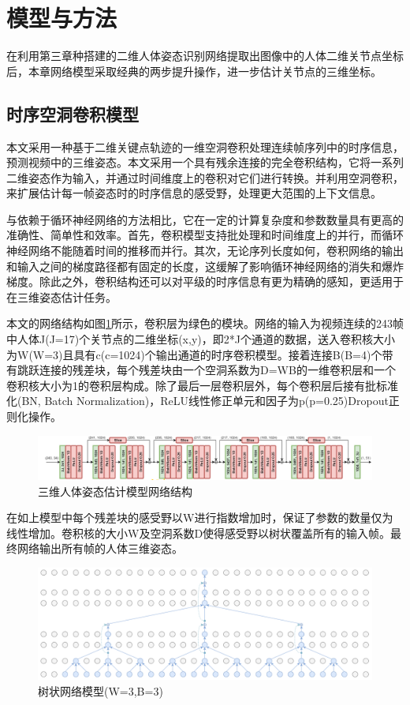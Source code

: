 \section{模型与方法}
在利用第三章种搭建的二维人体姿态识别网络提取出图像中的人体二维关节点坐标后，本章网络模型采取经典的两步提升操作，进一步估计关节点的三维坐标。

\subsection{时序空洞卷积模型}{}
本文采用一种基于二维关键点轨迹的一维空洞卷积处理连续帧序列中的时序信息，预测视频中的三维姿态。本文采用一个具有残余连接的完全卷积结构，它将一系列二维姿态作为输入，并通过时间维度上的卷积对它们进行转换。并利用空洞卷积，来扩展估计每一帧姿态时的时序信息的感受野，处理更大范围的上下文信息。

与依赖于循环神经网络的方法相比，它在一定的计算复杂度和参数数量具有更高的准确性、简单性和效率。首先，卷积模型支持批处理和时间维度上的并行，而循环神经网络不能随着时间的推移而并行。其次，无论序列长度如何，卷积网络的输出和输入之间的梯度路径都有固定的长度，这缓解了影响循环神经网络的消失和爆炸梯度。除此之外，卷积结构还可以对平级的时序信息有更为精确的感知，更适用于在三维姿态估计任务。

本文的网络结构如图\ref{fig:f23}所示，卷积层为绿色的模块。网络的输入为视频连续的243帧中人体J(J=17)个关节点的二维坐标(x,y)，即2*J个通道的数据，送入卷积核大小为W(W=3)且具有c(c=1024)个输出通道的时序卷积模型。接着连接B(B=4)个带有跳跃连接的残差块，每个残差块由一个空洞系数为D=WB的一维卷积层和一个卷积核大小为1的卷积层构成。除了最后一层卷积层外，每个卷积层后接有批标准化(BN, Batch Normalization)，ReLU线性修正单元和因子为p(p=0.25)Dropout正则化操作。

\begin{figure}[h]
	\centering
	\includegraphics[scale=0.4]{figures/23.png}
	\caption{三维人体姿态估计模型网络结构}
	\label{fig:f23}
\end{figure}

在如上模型中每个残差块的感受野以W进行指数增加时，保证了参数的数量仅为线性增加。卷积核的大小W及空洞系数D使得感受野以树状覆盖所有的输入帧。最终网络输出所有帧的人体三维姿态。

\begin{figure}[h]
	\centering
	\includegraphics[scale=0.4]{figures/24.png}
	\caption{树状网络模型(W=3,B=3)}
	\label{fig:f24}
\end{figure}



